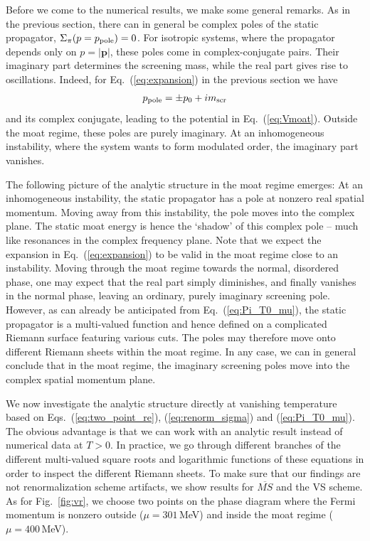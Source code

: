 \documentclass[reprint,english,superscriptaddress,preprintnumbers,amsmath,amssymb,aps,prd]{revtex4-2}
\def\eq#1{(\ref{#1})}
\def\Eq#1{Eq.~(\ref{#1})}
\def\Fig#1{Fig.~\ref{#1}}
\begin{document}
Before we come to the numerical results, we make some general remarks. As in the previous section, there can in general be complex poles of the static propagator, $\Sigma_\pi(p=p_{\rm pole}) = 0$. For isotropic systems, where the propagator depends only on $p = |\boldsymbol{p}|$, these poles come in complex-conjugate pairs. Their imaginary part determines the screening mass, while the real part gives rise to oscillations. Indeed, for \Eq{eq:expansion} in the previous section we have
\begin{align}
p_{\rm pole} = \pm p_0 + i m_{\rm scr}
\end{align}
and its complex conjugate, leading to the potential in \Eq{eq:Vmoat}. Outside the moat regime, these poles are purely imaginary. At an inhomogeneous instability, where the system wants to form modulated order, the imaginary part vanishes.

The following picture of the analytic structure in the moat regime emerges: At an inhomogeneous instability, the static propagator has a pole at nonzero real spatial momentum. Moving away from this instability, the pole moves into the complex plane. The static moat energy is hence the `shadow' of this complex pole -- much like resonances in the complex frequency plane. Note that we expect the expansion in \Eq{eq:expansion} to be valid in the moat regime close to an instability. Moving through the moat regime towards the normal, disordered phase, one may expect that the real part simply diminishes, and finally vanishes in the normal phase, leaving an ordinary, purely imaginary screening pole. However, as can already be anticipated from \Eq{eq:Pi_T0_mu}, the static propagator is a multi-valued function and hence defined on a complicated Riemann surface featuring various cuts. The poles may therefore move onto different Riemann sheets within the moat regime. In any case, we can in general conclude that in the moat regime, the imaginary screening poles move into the complex spatial momentum plane.

We now investigate the analytic structure directly at vanishing temperature based on Eqs.\ \eq{eq:two_point_re},  \eq{eq:renorm_sigma} and \eq{eq:Pi_T0_mu}. The obvious advantage is that we can work with an analytic result instead of numerical data at $T>0$.
In practice, we go through different branches of the different multi-valued square roots and logarithmic functions of these equations in order to inspect the different Riemann sheets.
To make sure that our findings are not renormalization scheme artifacts, we show results for $\overline{MS}$ and the VS scheme. As for \Fig{fig:vr}, we choose two points on the phase diagram where the Fermi momentum is nonzero outside ($\mu = 301$\,MeV) and inside the moat regime ($\mu = 400$\,MeV).
\end{document}
